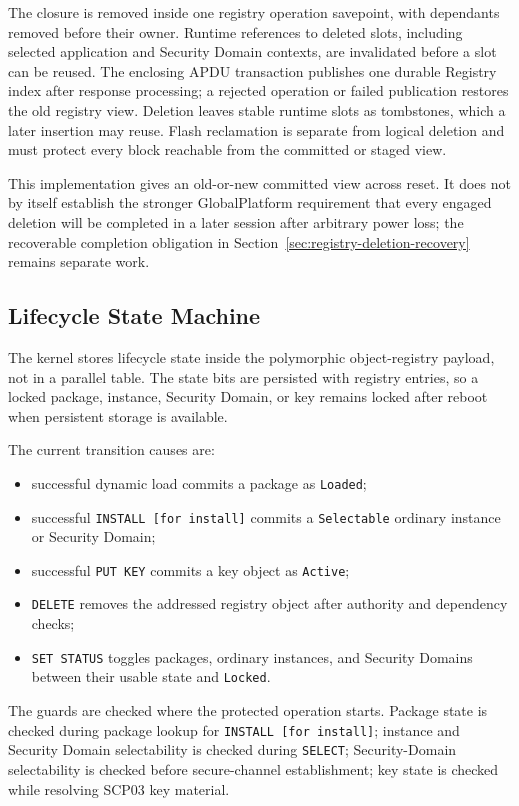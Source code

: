 The closure is removed inside one registry operation savepoint, with
dependants removed before their owner. Runtime references to deleted slots,
including selected application and Security Domain contexts, are invalidated
before a slot can be reused. The enclosing APDU transaction publishes one
durable Registry index after response processing; a rejected operation or
failed publication restores the old registry view. Deletion leaves stable
runtime slots as tombstones, which a later insertion may reuse. Flash
reclamation is separate from logical deletion and must protect every block
reachable from the committed or staged view.

This implementation gives an old-or-new committed view across reset. It does
not by itself establish the stronger GlobalPlatform requirement that every
engaged deletion will be completed in a later session after arbitrary power
loss; the recoverable completion obligation in
Section~\ref{sec:registry-deletion-recovery} remains separate work.

\subsection{Lifecycle State Machine}
\label{sec:impl-lifecycle-sm}

The kernel stores lifecycle state inside the polymorphic object-registry
payload, not in a parallel table. The state bits are persisted with registry
entries, so a locked package, instance, Security Domain, or key remains locked
after reboot when persistent storage is available.

The current transition causes are:
\begin{itemize}
\item successful dynamic load commits a package as \texttt{Loaded};
\item successful \texttt{INSTALL [for install]} commits a
      \texttt{Selectable} ordinary instance or Security Domain;
\item successful \texttt{PUT KEY} commits a key object as \texttt{Active};
\item \texttt{DELETE} removes the addressed registry object after authority
      and dependency checks;
\item \texttt{SET STATUS} toggles packages, ordinary instances, and Security
      Domains between their usable state and \texttt{Locked}.
\end{itemize}

The guards are checked where the protected operation starts. Package state is
checked during package lookup for \texttt{INSTALL [for install]}; instance and
Security Domain selectability is checked during \texttt{SELECT};
Security-Domain selectability is checked before secure-channel establishment;
key state is checked while resolving SCP03 key material.

